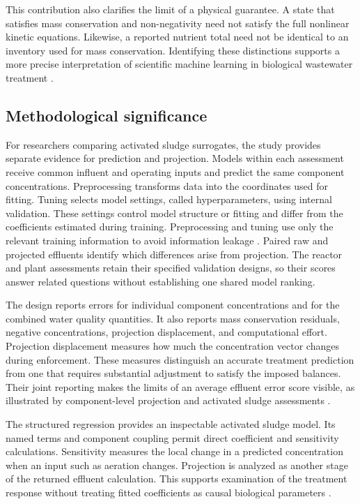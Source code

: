 This contribution also clarifies the limit of a physical guarantee. A state that satisfies mass conservation and non-negativity need not satisfy the full nonlinear kinetic equations. Likewise, a reported nutrient total need not be identical to an inventory used for mass conservation. Identifying these distinctions supports a more precise interpretation of scientific machine learning in biological wastewater treatment \citep{Henze2006,TakacsVanrolleghem2006}.

\subsection{Methodological significance}

For researchers comparing activated sludge surrogates, the study provides separate evidence for prediction and projection. Models within each assessment receive common influent and operating inputs and predict the same component concentrations. Preprocessing transforms data into the coordinates used for fitting. Tuning selects model settings, called hyperparameters, using internal validation. These settings control model structure or fitting and differ from the coefficients estimated during training. Preprocessing and tuning use only the relevant training information to avoid information leakage \citep{Kaufman2012}. Paired raw and projected effluents identify which differences arise from projection. The reactor and plant assessments retain their specified validation designs, so their scores answer related questions without establishing one shared model ranking.

The design reports errors for individual component concentrations and for the combined water quality quantities. It also reports mass conservation residuals, negative concentrations, projection displacement, and computational effort. Projection displacement measures how much the concentration vector changes during enforcement. These measures distinguish an accurate treatment prediction from one that requires substantial adjustment to satisfy the imposed balances. Their joint reporting makes the limits of an average effluent error score visible, as illustrated by component-level projection and activated sludge assessments \citep{SturmSilva2024,Selerio2026}.

The structured regression provides an inspectable activated sludge model. Its named terms and component coupling permit direct coefficient and sensitivity calculations. Sensitivity measures the local change in a predicted concentration when an input such as aeration changes. Projection is analyzed as another stage of the returned effluent calculation. This supports examination of the treatment response without treating fitted coefficients as causal biological parameters \citep{Brunton2016,Selerio2026}.

